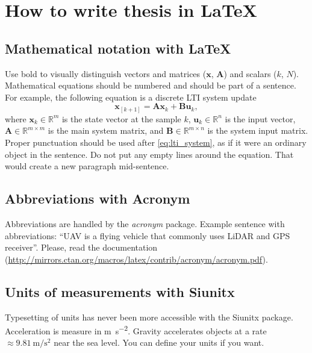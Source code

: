 
\chapter{How to write thesis in LaTeX\label{chap:how_to}}

\section{Mathematical notation with LaTeX}

Use bold to visually distinguish vectors and matrices ($\mathbf{x}$, $\mathbf{A}$) and scalars ($k$, $N$).
Mathematical equations should be numbered and should be part of a sentence.
For example, the following equation is a discrete LTI system update
\begin{equation}
  \mathbf{x}_{\left[k+1\right]} = \mathbf{A}\mathbf{x}_k + \mathbf{B}\mathbf{u}_k,
  \label{eq:lti_system}
\end{equation}
where $\mathbf{x}_k \in \mathbb{R}^m$ is the state vector at the sample $k$, $\mathbf{u}_k \in \mathbb{R}^n$ is the input vector, $\mathbf{A} \in \mathbb{R}^{m \times m}$ is the main system matrix, and $\mathbf{B} \in \mathbb{R}^{m \times n}$ is the system input matrix.
Proper punctuation should be used after \eqref{eq:lti_system}, as if it were an ordinary object in the sentence.
Do not put any empty lines around the equation.
That would create a new paragraph mid-sentence.

\section{Abbreviations with Acronym}

Abbreviations are handled by the \emph{acronym} package.
Example sentence with abbreviations: ``\ac{UAV} is a flying vehicle that commonly uses \ac{LiDAR} and \ac{GPS} receiver''.
Please, read the documentation (\url{http://mirrors.ctan.org/macros/latex/contrib/acronym/acronym.pdf}).

\section{Units of measurements with Siunitx}

Typesetting of units has never been more accessible with the Siunitx package.
Acceleration is measure in \si{\meter\per\second\squared}.
Gravity accelerates objects at a rate $\approx \SI{9.81}{\meter\per\second\squared}$ near the sea level.
You can define your units if you want.

